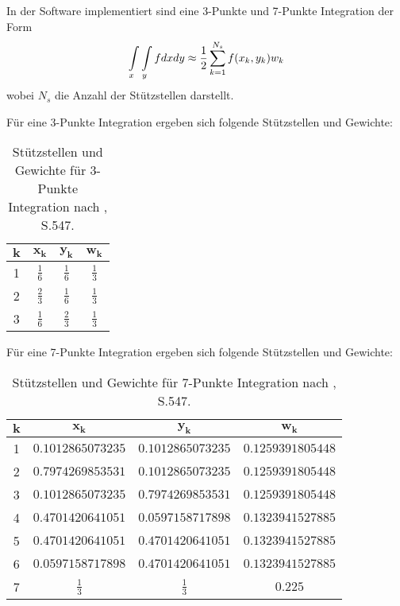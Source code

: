In der Software implementiert sind eine 3-Punkte und 7-Punkte Integration der Form  
\begin{equation}
\int\displaylimits_{x} \int\displaylimits_{y} f dx dy \approx \frac{1}{2}\sum\limits_{k = 1}^{N_s} f(x_k, y_k) w_k
\end{equation}
wobei $N_s$ die Anzahl der Stützstellen darstellt.\newline

Für eine 3-Punkte Integration ergeben sich folgende Stützstellen und Gewichte:
\begin{table}[H]
	\centering
\begin{tabular}{c|c|c|c}
	$\mathbf{k}$ & $\mathbf{x_k}$ & $\mathbf{y_k}$ & $\mathbf{w_k}$ \\
	\hline
	1 & $\frac{1}{6}$ & $\frac{1}{6}$ & $\frac{1}{3}$ \\
	2 & $\frac{2}{3}$ & $\frac{1}{6}$ & $\frac{1}{3}$ \\
	3 & $\frac{1}{6}$ & $\frac{2}{3}$ & $\frac{1}{3}$ \\
\end{tabular}
\caption{Stützstellen und Gewichte für 3-Punkte Integration nach \cite{bathe}, S.547.}
\label{tab:3-point_plane_integration}
\end{table}

Für eine 7-Punkte Integration ergeben sich folgende Stützstellen und Gewichte:
\begin{table}[H]
	\centering
	\begin{tabular}{c|c|c|c}
		$\mathbf{k}$ & $\mathbf{x_k}$ & $\mathbf{y_k}$ & $\mathbf{w_k}$ \\
		\hline
		1 & $0.1012865073235$ & $0.1012865073235$ & $0.1259391805448$ \\
		2 & $0.7974269853531$ & $0.1012865073235$ & $0.1259391805448$ \\
		3 & $0.1012865073235$ & $0.7974269853531$ & $0.1259391805448$ \\
		4 & $0.4701420641051$ & $0.0597158717898$ & $0.1323941527885$ \\
		5 & $0.4701420641051$ & $0.4701420641051$ & $0.1323941527885$ \\
		6 & $0.0597158717898$ & $0.4701420641051$ & $0.1323941527885$ \\
		7 & $\frac{1}{3}$ & $\frac{1}{3}$ & $0.225$ \\
	\end{tabular}
	\caption{Stützstellen und Gewichte für 7-Punkte Integration nach \cite{bathe}, S.547.}
	\label{tab:7-point_plane_integration}
\end{table}




